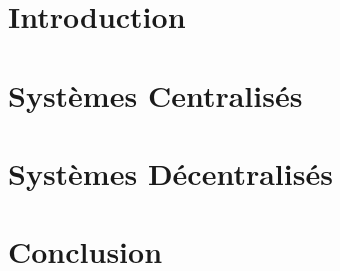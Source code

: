 \documentclass{article}
\begin{document}
\newpage

\tableofcontents

\newpage

\section{Introduction}


\newpage



\newpage
\section{Systèmes Centralisés}


\newpage
\section{Systèmes Décentralisés}


\newpage

\section{Conclusion}


\newpage

\printbibliography
\end{document}
